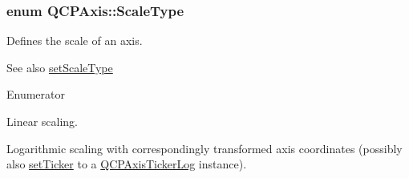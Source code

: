 \subsubsection[{\texorpdfstring{Scale\+Type}{ScaleType}}]{\setlength{\rightskip}{0pt plus 5cm}enum {\bf Q\+C\+P\+Axis\+::\+Scale\+Type}}\hypertarget{classQCPAxis_a36d8e8658dbaa179bf2aeb973db2d6f0}{}\label{classQCPAxis_a36d8e8658dbaa179bf2aeb973db2d6f0}
Defines the scale of an axis. \begin{DoxySeeAlso}{See also}
\hyperlink{classQCPAxis_adef29cae617af4f519f6c40d1a866ca6}{set\+Scale\+Type} 
\end{DoxySeeAlso}
\begin{Desc}
\item[Enumerator]\par
\begin{description}
\item[{\em 
st\+Linear\hypertarget{classQCPAxis_a36d8e8658dbaa179bf2aeb973db2d6f0aff6e30a11a828bc850caffab0ff994f6}{}\label{classQCPAxis_a36d8e8658dbaa179bf2aeb973db2d6f0aff6e30a11a828bc850caffab0ff994f6}
}]Linear scaling. \item[{\em 
st\+Logarithmic\hypertarget{classQCPAxis_a36d8e8658dbaa179bf2aeb973db2d6f0abf5b785ad976618816dc6f79b73216d4}{}\label{classQCPAxis_a36d8e8658dbaa179bf2aeb973db2d6f0abf5b785ad976618816dc6f79b73216d4}
}]Logarithmic scaling with correspondingly transformed axis coordinates (possibly also \hyperlink{classQCPAxis_a4ee03fcd2c74d05cd1a419b9af5cfbdc}{set\+Ticker} to a \hyperlink{classQCPAxisTickerLog}{Q\+C\+P\+Axis\+Ticker\+Log} instance). \end{description}
\end{Desc}
